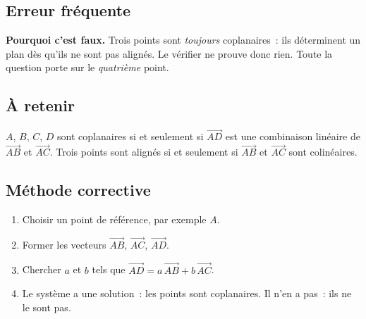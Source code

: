 

\subsection*{Erreur fréquente}


\textbf{Pourquoi c'est faux.} Trois points sont \emph{toujours} coplanaires~:
ils déterminent un plan dès qu'ils ne sont pas alignés. Le vérifier ne prouve
donc rien. Toute la question porte sur le \emph{quatrième} point.


\subsection*{À retenir}

$A$, $B$, $C$, $D$ sont coplanaires si et seulement si $\vec{AD}$ est une
combinaison linéaire de $\vec{AB}$ et $\vec{AC}$. Trois points sont alignés si
et seulement si $\vec{AB}$ et $\vec{AC}$ sont colinéaires.

\subsection*{Méthode corrective}

\begin{enumerate}
  \item Choisir un point de référence, par exemple $A$.
  \item Former les vecteurs $\vec{AB}$, $\vec{AC}$, $\vec{AD}$.
  \item Chercher $a$ et $b$ tels que $\vec{AD}=a\,\vec{AB}+b\,\vec{AC}$.
  \item Le système a une solution~: les points sont coplanaires. Il n'en a
        pas~: ils ne le sont pas.
\end{enumerate}

